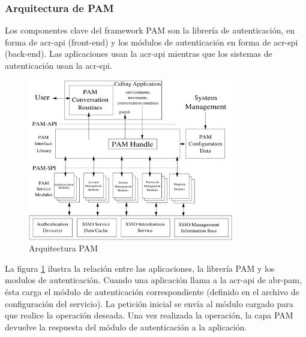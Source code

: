 \documentclass[titlepage, 12pt, a4paper]{article}
\begin{document}
\subsubsection{Arquitectura de PAM}
Los componentes clave del framework PAM son la librería de autenticación, en forma de \gls{acr-api} (\gls{front-end}) y los módulos de autenticación en forma de \gls{acr-spi} (\gls{back-end}). Las aplicaciones usan la \gls{acr-api} mientras que los sistemas de autenticación usan la \gls{acr-spi}.
\begin{figure}[H]
    \centering
    \includegraphics[width=0.8\textwidth]{Media/PAMFramework.png}
    \caption{Arquitectura PAM}
    \label{fig:arquitecturaPAM}
\end{figure}
La figura \ref{fig:arquitecturaPAM} ilustra la relación entre las aplicaciones, la librería PAM y los modulos de autenticación. Cuando una aplicación llama a la \gls{acr-api} de \gls{abr-pam}, ésta carga el módulo de autenticación correspondiente (definido en el archivo de configuración del servicio). La petición inicial se envía al módulo cargado para que realice la operación deseada. Una vez realizada la operación, la capa PAM devuelve la respuesta del módulo de autenticación a la aplicación\cite{PAM}.
\end{document}
